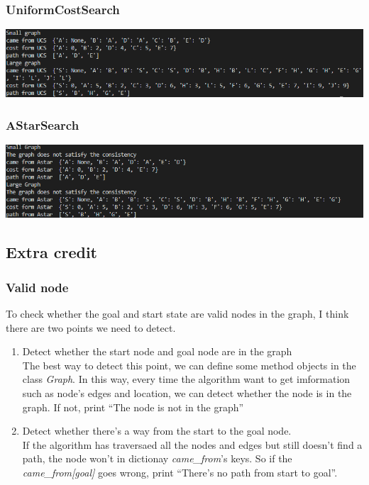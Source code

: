 \documentclass[aps,letterpaper,10pt]{revtex4}
\begin{document}
\subsubsection{UniformCostSearch}
\centerline{\includegraphics[scale=0.6]{UCS.png}}
\vspace{3mm}
\subsubsection{AStarSearch}
\centerline{\includegraphics[scale=0.6]{A_star.png}}
\vspace{3mm}
\subsection{Extra credit}
\subsubsection{Valid node}
To check whether the goal and start state are valid nodes in the graph, I think there are two points we need to detect.
\begin{enumerate}
\item
Detect whether the start node and goal node are in the graph\\
The best way to detect this point, we can define some method objects in the class \emph{Graph}.
In this way, every time the algorithm want to get imformation such 
as node's edges and location, we can detect whether the node is in the 
graph. If not, print ``The node is not in the graph''\\
\item
Detect whether there's a way from the start to the goal node.\\
If the algorithm has traversaed all the nodes and edges but still doesn't find a path,
the node won't in dictionay \emph{came\_from}'s keys. So if the \emph{came\_from[goal]} 
goes wrong, print ``There's no path from start to goal''.
\end{enumerate}
\end{document}
